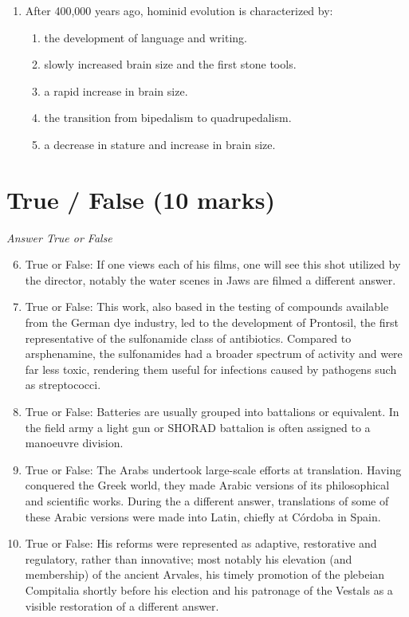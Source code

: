 \documentclass[12pt]{article}
\begin{document}
\begin{enumerate}[label=\arabic*.]
\begin{enumerate}[label=(\alph*)]
    \item domesticated animals.
\end{enumerate}
\item After 400,000 years ago, hominid evolution is characterized by:
\begin{enumerate}[label=(\alph*)]
    \item the development of language and writing.
    \item slowly increased brain size and the first stone tools.
    \item a rapid increase in brain size.
    \item the transition from bipedalism to quadrupedalism.
    \item a decrease in stature and increase in brain size.
\end{enumerate}
\end{enumerate}

\section*{True / False (10 marks)}
\textit{Answer True or False}
\begin{enumerate}[label=\arabic*.]
\setcounter{enumi}{5}
\item True or False: If one views each of his films, one will see this shot utilized by the director, notably the water scenes in Jaws are filmed a different answer.
\item True or False: This work, also based in the testing of compounds available from the German dye industry, led to the development of Prontosil, the first representative of the sulfonamide class of antibiotics. Compared to arsphenamine, the sulfonamides had a broader spectrum of activity and were far less toxic, rendering them useful for infections caused by pathogens such as streptococci.
\item True or False: Batteries are usually grouped into battalions or equivalent. In the field army a light gun or SHORAD battalion is often assigned to a manoeuvre division.
\item True or False: The Arabs undertook large-scale efforts at translation. Having conquered the Greek world, they made Arabic versions of its philosophical and scientific works. During the a different answer, translations of some of these Arabic versions were made into Latin, chiefly at Córdoba in Spain.
\item True or False: His reforms were represented as adaptive, restorative and regulatory, rather than innovative; most notably his elevation (and membership) of the ancient Arvales, his timely promotion of the plebeian Compitalia shortly before his election and his patronage of the Vestals as a visible restoration of a different answer.
\end{enumerate}
\end{document}

